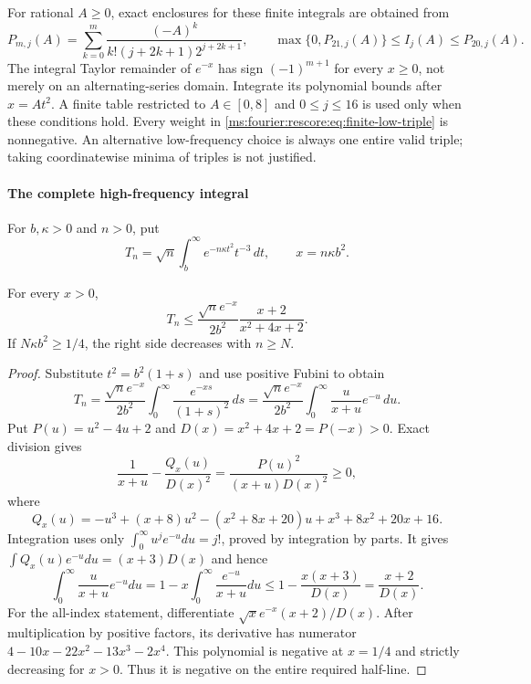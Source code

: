 For rational $A\ge0$, exact enclosures for these finite integrals are
obtained from
\begin{equation}\label{ms:fourier:rescore:eq:finite-gaussian-integral}
 P_{m,j}(A)=\sum_{k=0}^m
 \frac{(-A)^k}{k!(j+2k+1)2^{j+2k+1}},\qquad
 \max\{0,P_{21,j}(A)\}\le I_j(A)\le P_{20,j}(A).
\end{equation}
The integral Taylor remainder of $e^{-x}$ has sign $(-1)^{m+1}$
for every $x\ge0$, not merely on an alternating-series domain.
Integrate its polynomial bounds after $x=At^2$.
A finite table restricted to $A\in[0,8]$ and $0\le j\le16$
is used only when these conditions hold.
Every weight in \eqref{ms:fourier:rescore:eq:finite-low-triple} is nonnegative.
An alternative low-frequency choice is always one entire valid triple; taking
coordinatewise minima of triples is not justified.

\paragraph{The complete high-frequency integral}
For $b,\kappa>0$ and $n>0$, put
\[
 T_n=\sqrt n\int_b^\infty e^{-n\kappa t^2}t^{-3}\,dt,
 \qquad x=n\kappa b^2.
\]
\begin{lemma}\label{ms:fourier:laguerre}
For every $x>0$,
\[
 T_n\le\frac{\sqrt n e^{-x}}{2b^2}
                  \frac{x+2}{x^2+4x+2}.
\]
If $N\kappa b^2\ge1/4$, the right side decreases with $n\ge N$.
\end{lemma}
\begin{proof}
Substitute $t^2=b^2(1+s)$ and use positive Fubini to obtain
\[
 T_n=\frac{\sqrt n e^{-x}}{2b^2}
 \int_0^\infty\frac{e^{-xs}}{(1+s)^2}\,ds
 =\frac{\sqrt n e^{-x}}{2b^2}
 \int_0^\infty\frac{u}{x+u}e^{-u}\,du.
\]
Put $P(u)=u^2-4u+2$ and $D(x)=x^2+4x+2=P(-x)>0$.
Exact division gives
\[
 \frac1{x+u}-\frac{Q_x(u)}{D(x)^2}
       =\frac{P(u)^2}{(x+u)D(x)^2}\ge0,
\]
where
\[
 Q_x(u)=-u^3+(x+8)u^2-(x^2+8x+20)u
                  +x^3+8x^2+20x+16.
\]
Integration uses only $\int_0^\infty u^j e^{-u}du=j!$, proved by
integration by parts. It gives
$\int Q_x(u)e^{-u}du=(x+3)D(x)$ and hence
\[
 \int_0^\infty\frac{u}{x+u}e^{-u}du
 =1-x\int_0^\infty\frac{e^{-u}}{x+u}du
 \le1-\frac{x(x+3)}{D(x)}=\frac{x+2}{D(x)}.
\]
For the all-index statement, differentiate
$\sqrt{x}e^{-x}(x+2)/D(x)$. After multiplication by positive factors,
its derivative has numerator
$4-10x-22x^2-13x^3-2x^4$. This polynomial is negative at $x=1/4$
and strictly decreasing for $x>0$. Thus it is negative on the entire
required half-line.
\end{proof}


